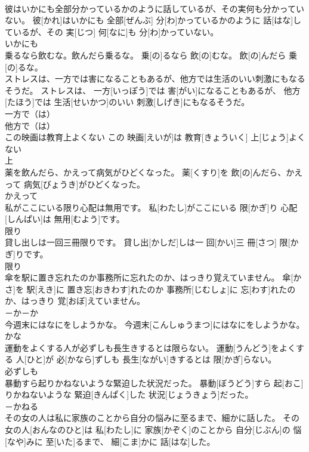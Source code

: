 \documentclass[8pt]{extreport}
\begin{document}
\begin{CJK}{UTF8}{min}
\\	彼はいかにも全部分かっているかのように話しているが、その実何も分かっていない。	彼[かれ]はいかにも 全部[ぜんぶ] 分[わ]かっているかのように 話[はな]しているが、その 実[じつ] 何[なに]も 分[わ]かっていない。	
\\	いかにも	
\\	乗るなら飲むな。飲んだら乗るな。	乗[の]るなら 飲[の]むな。 飲[の]んだら 乗[の]るな。	
\\	ストレスは、一方では害になることもあるが、他方では生活のいい刺激にもなるそうだ。	ストレスは、 一方[いっぽう]では 害[がい]になることもあるが、 他方[たほう]では 生活[せいかつ]のいい 刺激[しげき]にもなるそうだ。	
\\	一方で（は） 
\\	他方で（は）	
\\	この映画は教育上よくない	この 映画[えいが]は 教育[きょういく] 上[じょう]よくない	
\\	上	
\\	薬を飲んだら、かえって病気がひどくなった。	薬[くすり]を 飲[の]んだら、かえって 病気[びょうき]がひどくなった。	
\\	かえって	
\\	私がここにいる限り心配は無用です。	私[わたし]がここにいる 限[かぎ]り 心配[しんぱい]は 無用[むよう]です。	
\\	限り	
\\	貸し出しは一回三冊限りです。	貸し出[かしだ]しは一 回[かい]三 冊[さつ] 限[かぎ]りです。	
\\	限り 
\\	傘を駅に置き忘れたのか事務所に忘れたのか、はっきり覚えていません。	傘[かさ]を 駅[えき]に 置き忘[おきわす]れたのか 事務所[じむしょ]に 忘[わす]れたのか、はっきり 覚[おぼ]えていません。	
\\	－か－か	
\\	今週末にはなにをしようかな。	今週末[こんしゅうまつ]にはなにをしようかな。	
\\	かな	
\\	運動をよくする人が必ずしも長生きするとは限らない。	運動[うんどう]をよくする 人[ひと]が 必[かなら]ずしも 長生[ながい]きするとは 限[かぎ]らない。	
\\	必ずしも	
\\	暴動すら起りかねないような緊迫した状況だった。	暴動[ぼうどう]すら 起[おこ]りかねないような 緊迫[きんぱく]した 状況[じょうきょう]だった。	
\\	－かねる	
\\	その女の人は私に家族のことから自分の悩みに至るまで、細かに話した。	その 女の人[おんなのひと]は 私[わたし]に 家族[かぞく]のことから 自分[じぶん]の 悩[なや]みに 至[いた]るまで、 細[こま]かに 話[はな]した。	

\end{CJK}
\end{document}
